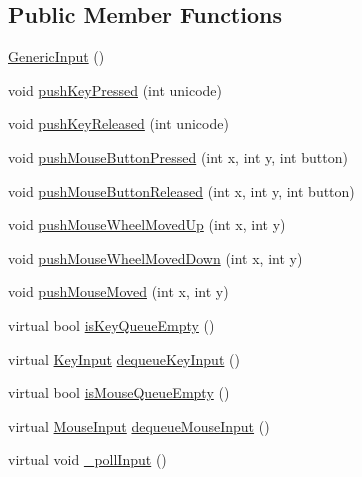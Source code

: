 \subsection*{Public Member Functions}
\begin{DoxyCompactItemize}
\item 
\hyperlink{classgcn_1_1GenericInput_a5faf6486010b0c13c14ac2d80fc05609}{Generic\+Input} ()
\item 
void \hyperlink{classgcn_1_1GenericInput_a347258d8ee30fe5637f5eeb1e15e8eb4}{push\+Key\+Pressed} (int unicode)
\item 
void \hyperlink{classgcn_1_1GenericInput_a8db8d150eef492434df647351731dbe3}{push\+Key\+Released} (int unicode)
\item 
void \hyperlink{classgcn_1_1GenericInput_af951a9c1b061685a6f653ba01b4abb73}{push\+Mouse\+Button\+Pressed} (int x, int y, int button)
\item 
void \hyperlink{classgcn_1_1GenericInput_a87a8597cb766115cddca7844df852ba4}{push\+Mouse\+Button\+Released} (int x, int y, int button)
\item 
void \hyperlink{classgcn_1_1GenericInput_a7e070cf0ce34e720519b427489fdb86a}{push\+Mouse\+Wheel\+Moved\+Up} (int x, int y)
\item 
void \hyperlink{classgcn_1_1GenericInput_ab0a4399fe1487dc8355f4a6ce5c3d6d1}{push\+Mouse\+Wheel\+Moved\+Down} (int x, int y)
\item 
void \hyperlink{classgcn_1_1GenericInput_aa07fa9d97d110e0d5e97763112e156d8}{push\+Mouse\+Moved} (int x, int y)
\item 
virtual bool \hyperlink{classgcn_1_1GenericInput_a095d139685ca11045a3f6d8041fe97f1}{is\+Key\+Queue\+Empty} ()
\item 
virtual \hyperlink{classgcn_1_1KeyInput}{Key\+Input} \hyperlink{classgcn_1_1GenericInput_a2a1ee4f5f85ec92e2d79e96a394c7880}{dequeue\+Key\+Input} ()
\item 
virtual bool \hyperlink{classgcn_1_1GenericInput_a67de2fb91e717d67b018fea8243ecd3d}{is\+Mouse\+Queue\+Empty} ()
\item 
virtual \hyperlink{classgcn_1_1MouseInput}{Mouse\+Input} \hyperlink{classgcn_1_1GenericInput_acdc29660e3b837cd9152d99a7457dcd1}{dequeue\+Mouse\+Input} ()
\item 
virtual void \hyperlink{classgcn_1_1GenericInput_aaa13d9c4a0c39efcf5ff18aeecfd5f86}{\+\_\+poll\+Input} ()
\end{DoxyCompactItemize}
